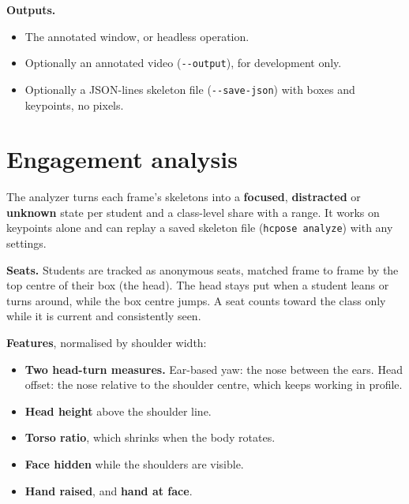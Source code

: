 
\textbf{Outputs.}

\begin{itemize}
\tightlist
\item
  The annotated window, or headless operation.
\item
  Optionally an annotated video (\texttt{-\/-output}), for development only.
\item
  Optionally a JSON-lines skeleton file (\texttt{-\/-save-json}) with boxes and keypoints, no pixels.
\end{itemize}


\section{Engagement analysis}

The analyzer turns each frame's skeletons into a \textbf{focused}, \textbf{distracted} or \textbf{unknown} state per student and a class-level share with a range. It works on keypoints alone and can replay a saved skeleton file (\texttt{hcpose\ analyze}) with any settings.

\textbf{Seats.} Students are tracked as anonymous seats, matched frame to frame by the top centre of their box (the head). The head stays put when a student leans or turns around, while the box centre jumps. A seat counts toward the class only while it is current and consistently seen.

\textbf{Features}, normalised by shoulder width:

\begin{itemize}
\tightlist
\item
  \textbf{Two head-turn measures.} Ear-based yaw: the nose between the ears. Head offset: the nose relative to the shoulder centre, which keeps working in profile.
\item
  \textbf{Head height} above the shoulder line.
\item
  \textbf{Torso ratio}, which shrinks when the body rotates.
\item
  \textbf{Face hidden} while the shoulders are visible.
\item
  \textbf{Hand raised}, and \textbf{hand at face}.
\end{itemize}

